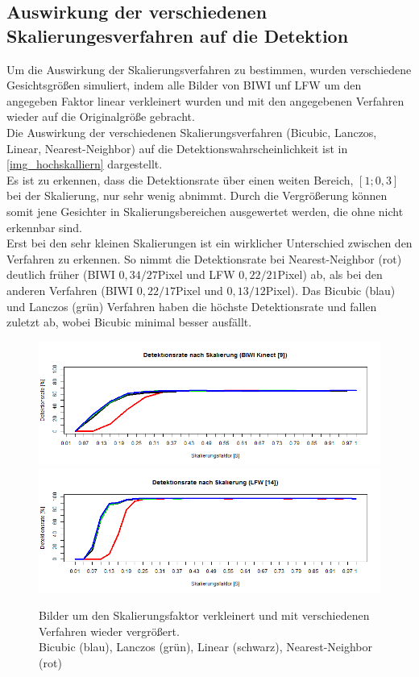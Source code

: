 \subsection{Auswirkung der verschiedenen Skalierungesverfahren auf die Detektion}
\label{OpenFace_skal}
Um die Auswirkung der Skalierungsverfahren zu bestimmen, wurden verschiedene Gesichtsgrößen simuliert, indem alle Bilder von BIWI unf LFW um den angegeben Faktor linear verkleinert wurden und mit den angegebenen Verfahren wieder auf die Originalgröße gebracht.\\
Die Auswirkung der verschiedenen Skalierungsverfahren (Bicubic, Lanczos, Linear, Nearest-Neighbor) auf die Detektionswahrscheinlichkeit ist in \autoref{img_hochskalliern} dargestellt.\\
Es ist zu erkennen, dass die Detektionsrate über einen weiten Bereich, $[1;0,3]$ bei der Skalierung, nur sehr wenig abnimmt. Durch die Vergrößerung können somit jene Gesichter in Skalierungsbereichen ausgewertet werden, die ohne nicht erkennbar sind.\\
Erst bei den sehr kleinen Skalierungen ist ein wirklicher Unterschied zwischen den Verfahren zu erkennen. So nimmt die Detektionsrate bei  Nearest-Neighbor (rot) deutlich früher (BIWI $0,34/27$Pixel und LFW $0,22/21$Pixel) ab, als bei den anderen Verfahren (BIWI $0,22/17$Pixel und $0,13/12$Pixel). Das Bicubic (blau) und Lanczos (grün) Verfahren haben die höchste Detektionsrate und fallen zuletzt ab, wobei Bicubic minimal besser ausfällt.
\begin{figure}
	\centering
	\includegraphics[width=\linewidth]{img_Skalierung/Resize_Rate_Ges}\\
	\includegraphics[width=\linewidth]{img_Skalierung/Resize_Rate_lfw}
	\caption{Bilder um den Skalierungsfaktor verkleinert und mit verschiedenen Verfahren wieder vergrößert.\\
		Bicubic (blau), Lanczos (grün), Linear (schwarz), Nearest-Neighbor (rot)}
	\label{img_hochskalliern}
\end{figure}
